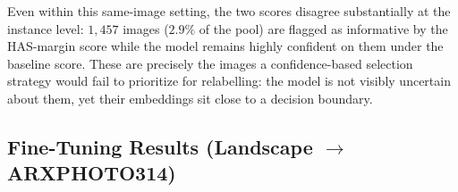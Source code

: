 Even within this same-image setting, the two scores disagree substantially 
at the instance level: $1{,}457$ images ($2.9\%$ of the
pool) are flagged as informative by the HAS-margin score while the model 
remains highly confident on them under the baseline score. These
are precisely the images a confidence-based selection strategy would fail 
to prioritize for relabelling: the model is not visibly uncertain
about them, yet their embeddings sit close to a decision boundary.

\subsection{Fine-Tuning Results (Landscape $\to$ ARXPHOTO314)}
\label{sec:res_finetune}






